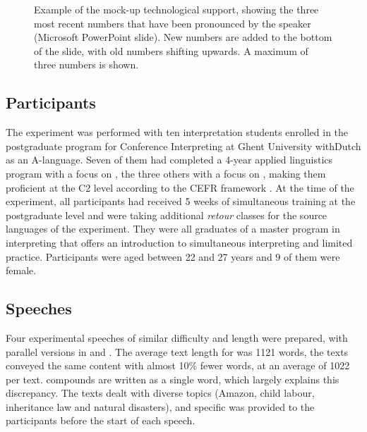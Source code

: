 \documentclass[output=paper]{langsci/langscibook}
\begin{document}
\begin{figure}
\caption{Example of the mock-up technological support, showing the three most recent numbers that have been pronounced by the speaker (Microsoft PowerPoint slide). New numbers are added to the bottom of the slide, with old numbers shifting upwards. A maximum of three numbers is shown.\label{fig:01:1}}
\end{figure}

\subsection{Participants}

The experiment was performed with ten interpretation students enrolled in the postgraduate program for Conference Interpreting at Ghent University with\linebreak Dutch as an A-language. Seven of them had completed a 4-year applied linguistics program with a focus on , the three others with a focus on , making them proficient at the C2 level according to the \textsc{CEFR} framework \citep{Council2001}. At the time of the experiment, all participants had received 5 weeks of simultaneous training at the postgraduate level and were taking additional \textit{retour} classes for the source languages of the experiment. They were all graduates of a master program in interpreting that offers an introduction to simultaneous interpreting and limited practice. Participants were aged between 22 and 27 years and 9 of them were female. 

\subsection{Speeches}

Four experimental speeches of similar difficulty and length were prepared, with parallel versions in  and . The average text length for  was 1121 words, the  texts conveyed the same content with almost 10\% fewer words, at an average of 1022 per text.  compounds are written as a single word, which largely explains this discrepancy. The texts dealt with diverse topics (Amazon, child labour, inheritance law and natural disasters), and specific  was provided to the participants before the start of each speech.
\end{document}
